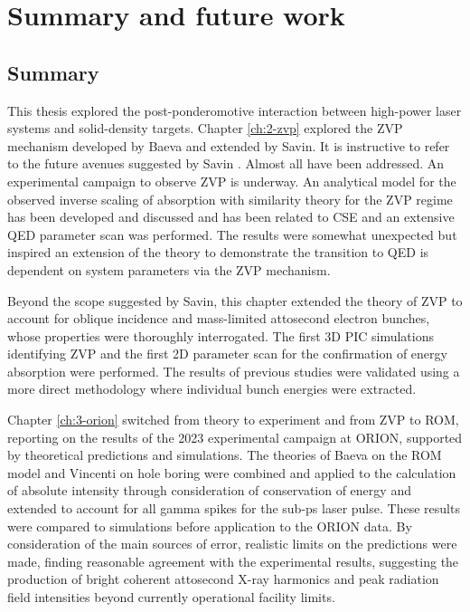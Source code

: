 \chapter{\label{ch:5-summary}Summary and future work} 

\minitoc

\section{Summary}
This thesis explored the post-ponderomotive interaction between high-power laser systems and solid-density targets. Chapter \ref{ch:2-zvp} explored the ZVP mechanism developed by Baeva and extended by Savin. It is instructive to refer to the future avenues suggested by Savin \cite{savinModellingLaserPlasmaInteractions2019}. Almost all have been addressed. An experimental campaign to observe ZVP is underway. An analytical model for the observed inverse scaling of absorption with similarity theory for the ZVP regime has been developed and discussed and has been related to \ac{CSE} and an extensive QED parameter scan was performed. The results were somewhat unexpected but inspired an extension of the theory to demonstrate the transition to QED is dependent on system parameters via the ZVP mechanism.

Beyond the scope suggested by Savin, this chapter extended the theory of ZVP to account for oblique incidence and mass-limited attosecond electron bunches, whose properties were thoroughly interrogated. The first 3D PIC simulations identifying ZVP and the first 2D parameter scan for the confirmation of energy absorption were performed. The results of previous studies were validated using a more direct methodology where individual bunch energies were extracted.

Chapter \ref{ch:3-orion} switched from theory to experiment and from ZVP to ROM, reporting on the results of the 2023 experimental campaign at ORION, supported by theoretical predictions and simulations. The theories of Baeva on the ROM model and Vincenti on hole boring were combined and applied to the calculation of absolute intensity through consideration of conservation of energy and extended to account for all gamma spikes for the sub-ps laser pulse. These results were compared to simulations before application to the ORION data. By consideration of the main sources of error, realistic limits on the predictions were made, finding reasonable agreement with the experimental results, suggesting the production of bright coherent attosecond X-ray harmonics and peak radiation field intensities beyond currently operational facility limits.

